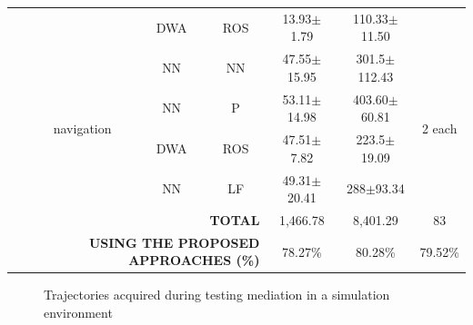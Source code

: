 \begin{table}
{\begin{tabular}{ccccccc}
 &  & DWA & ROS & 13.93$\pm$1.79 & 110.33$\pm$11.50 & \\ \cmidrule{2-7} 
 & \multirow{4}{*}{navigation} & NN & NN & 47.55$\pm$15.95 & 301.5$\pm$112.43 & \multirow{4}{*}{2 each} \\
 &  & NN & P & 53.11$\pm$14.98 & 403.60$\pm$60.81 &  \\
 &  & DWA & ROS & 47.51$\pm$7.82 & 223.5$\pm$19.09 &  \\
 &  & NN & LF & 49.31$\pm$20.41 & 288$\pm$93.34 &  \\
 \midrule
 \multicolumn{4}{r}{\textbf{TOTAL}} &  1,466.78 & 8,401.29 & 83 \\
 \multicolumn{4}{r}{\textbf{USING THE PROPOSED APPROACHES (\%)}} &  78.27\% & 80.28\% & 79.52\% \\ 
 \bottomrule
\end{tabular}%
}
\end{table}



\begin{figure}
    \centering
    \hfill
    \caption{Trajectories acquired during testing mediation in a simulation environment}
    \label{fig:SimulationTest}
\end{figure}

